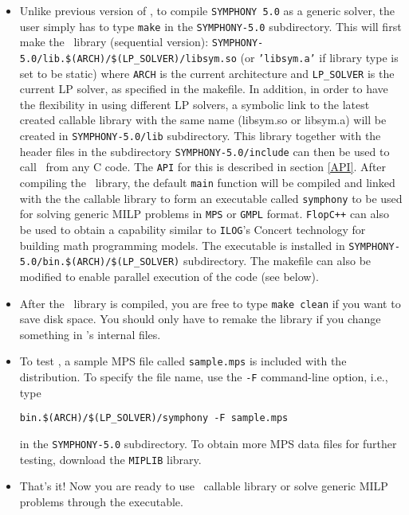 \begin{itemize}

      \item Unlike previous version of \BB, to compile \texttt{SYMPHONY 5.0} as 
a generic solver, the user simply has to type \texttt{make} in the 
\texttt{SYMPHONY-5.0} subdirectory. This will 
first make the \BB\ library (sequential version): 
\texttt{SYMPHONY-5.0/lib.\$(ARCH)/\$(LP\_SOLVER)/libsym.so} (or 
\texttt{'libsym.a'} if library type is set to be static) where 
\texttt{ARCH} is the current architecture and \texttt{LP\_SOLVER} is the 
current LP solver, as specified in the makefile. In addition, in order 
to have the flexibility in using different LP solvers, a symbolic link to the 
latest created callable library with the same name (libsym.so or libsym.a) 
will be created in \texttt{SYMPHONY-5.0/lib} subdirectory. This library 
together with the header files in the subdirectory 
\texttt{SYMPHONY-5.0/include} can then be used to call \BB\ from any C code. 
The \texttt{API} for this is described in section \ref{API}. After compiling
the \BB\ library, the default \texttt{main} function will be compiled and
linked with the the callable library to form an executable called
\texttt{symphony} to be used for solving generic MILP problems in \texttt{MPS}
or \texttt{GMPL} format. \texttt{FlopC++} \cite{flopc++} can also be used to
obtain a capability similar to \texttt{ILOG}'s Concert technology for building
math programming models. The executable is installed in
\texttt{SYMPHONY-5.0/bin.\$(ARCH)/\$(LP\_SOLVER)} subdirectory. The makefile 
can also be modified to enable parallel execution of the code (see below).


\item After the \BB\ library is compiled, you are free to type {\tt make
        clean} if you want to save disk space. You should only have to
        remake the library if you change something in \BB's internal files. 

\item To test \BB, a sample MPS file called \texttt{sample.mps} is 
included with the distribution. To specify the file name, use the 
\texttt{-F} command-line option, i.e., type 
\begin{verbatim}
bin.$(ARCH)/$(LP_SOLVER)/symphony -F sample.mps 
\end{verbatim}
in the \texttt{SYMPHONY-5.0} subdirectory. To obtain more MPS data files for
further testing, download the \texttt{MIPLIB} library.

\item That's it! Now you are ready to use \BB\ callable library or 
solve generic MILP problems through the executable.

\end{itemize}

